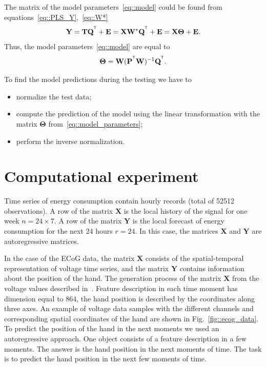 \documentclass[12pt,twoside]{article}
\newcommand{\bY}{\mathbf{Y}}
\newcommand{\bX}{\mathbf{X}}
\newcommand{\bP}{\mathbf{P}}
\newcommand{\bT}{\mathbf{T}}
\newcommand{\bQ}{\mathbf{Q}}
\newcommand{\bE}{\mathbf{E}}
\newcommand{\bW}{\mathbf{W}}
\newcommand{\bTheta}{\boldsymbol{\Theta}}
\newcommand{\T}{^{\text{\tiny\sffamily\upshape\mdseries T}}}
\begin{document}
The matrix of the model parameters~\ref{eq::model} could be found from equations~\eqref{eq::PLS_Y},~\eqref{eq::W*}
\begin{equation*}
    \bY = \bT \bQ^{\T} + \bE = \bX \bW^* \bQ^{\T} + \bE = \bX \bTheta + \bE.
\end{equation*}
Thus, the model parameters~\eqref{eq::model} are equal to
\begin{equation}
    \bTheta = \bW (\bP^{\T} \bW)^{-1} \bQ^{\T}.
    \label{eq::model_parameters}
\end{equation}

To find the model predictions during the testing we have to
\begin{itemize}
	\item normalize the test data;
	\item compute the prediction of the model using the linear transformation with the matrix $\bTheta$ from~\eqref{eq::model_parameters};
	\item perform the inverse normalization.
\end{itemize}

\section{Computational experiment}
\label{sec:exper}

Time series of energy consumption contain hourly records (total of 52512 observations). 
A row of the matrix $\bX$ is the local history of the signal for one week $n = 24 \times 7$. 
A row of the matrix $\bY$ is the local forecast of energy consumption for the next 24 hours $r = 24$. 
In this case, the matrices $\bX$ and $\bY$ are autoregressive matrices.

In the case of the ECoG data, the matrix $\bX$ consists of the spatial-temporal representation of voltage time series, and the matrix $\bY$ contains information about the position of the hand.
The generation process of the matrix $\bX$ from the voltage values described in~\cite{gasanov2017pls}. 
Feature description in each time moment has dimension equal to $864$, the hand position is described by the coordinates along three axes. 
An example of voltage data samples with the different channels and corresponding spatial coordinates of the hand are shown in Fig.~\ref{fig::ecog_data}.
To predict the position of the hand in the next moments we used an autoregressive approach.
One object consists of a feature description in a few moments. 
The answer is the hand position in the next moments of time.
The task is to predict the hand position in the next few moments of time.
\end{document}
